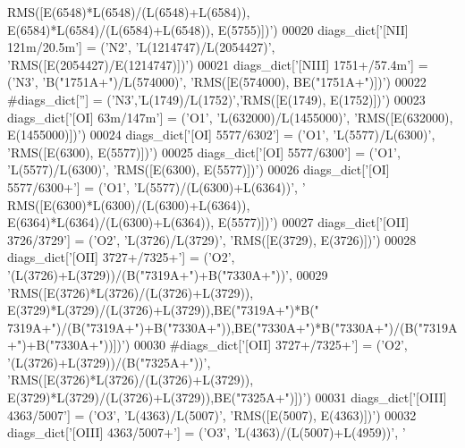 \begin{DoxyCode}
{      RMS([E(6548)*L(6548)/(L(6548)+L(6584)), E(6584)*L(6584)/(L(6584)+L(6548)), E(5755)])'})
00020 diags\_dict[\textcolor{stringliteral}{'[NII] 121m/20.5m'}] = (\textcolor{stringliteral}{'N2'}, \textcolor{stringliteral}{'L(1214747)/L(2054427)'}, \textcolor{stringliteral}{'RMS([E(2054427)/E(1214747)])'})
00021 diags\_dict[\textcolor{stringliteral}{'[NIII] 1751+/57.4m'}] = (\textcolor{stringliteral}{'N3'}, \textcolor{stringliteral}{'B("1751A+")/L(574000)'}, \textcolor{stringliteral}{'RMS([E(574000), BE("1751A+")])'})
00022 \textcolor{comment}{#diags\_dict[''] = ('N3','L(1749)/L(1752)','RMS([E(1749), E(1752)])')}
00023 diags\_dict[\textcolor{stringliteral}{'[OI] 63m/147m'}] = (\textcolor{stringliteral}{'O1'}, \textcolor{stringliteral}{'L(632000)/L(1455000)'}, \textcolor{stringliteral}{'RMS([E(632000), E(1455000)])'})
00024 diags\_dict[\textcolor{stringliteral}{'[OI] 5577/6302'}] = (\textcolor{stringliteral}{'O1'}, \textcolor{stringliteral}{'L(5577)/L(6300)'}, \textcolor{stringliteral}{'RMS([E(6300), E(5577)])'})
00025 diags\_dict[\textcolor{stringliteral}{'[OI] 5577/6300'}] = (\textcolor{stringliteral}{'O1'}, \textcolor{stringliteral}{'L(5577)/L(6300)'}, \textcolor{stringliteral}{'RMS([E(6300), E(5577)])'})
00026 diags\_dict[\textcolor{stringliteral}{'[OI] 5577/6300+'}] = (\textcolor{stringliteral}{'O1'}, \textcolor{stringliteral}{'L(5577)/(L(6300)+L(6364))'}, \textcolor{stringliteral}{'
      RMS([E(6300)*L(6300)/(L(6300)+L(6364)), E(6364)*L(6364)/(L(6300)+L(6364)), E(5577)])'})
00027 diags\_dict[\textcolor{stringliteral}{'[OII] 3726/3729'}] = (\textcolor{stringliteral}{'O2'}, \textcolor{stringliteral}{'L(3726)/L(3729)'}, \textcolor{stringliteral}{'RMS([E(3729), E(3726)])'})
00028 diags\_dict[\textcolor{stringliteral}{'[OII] 3727+/7325+'}] = (\textcolor{stringliteral}{'O2'}, \textcolor{stringliteral}{'(L(3726)+L(3729))/(B("7319A+")+B("7330A+"))'},
00029               \textcolor{stringliteral}{'RMS([E(3726)*L(3726)/(L(3726)+L(3729)), E(3729)*L(3729)/(L(3726)+L(3729)),BE("7319A+")*B("
      7319A+")/(B("7319A+")+B("7330A+")),BE("7330A+")*B("7330A+")/(B("7319A+")+B("7330A+"))])'})
00030 \textcolor{comment}{#diags\_dict['[OII] 3727+/7325+'] = ('O2', '(L(3726)+L(3729))/(B("7325A+"))',
       'RMS([E(3726)*L(3726)/(L(3726)+L(3729)), E(3729)*L(3729)/(L(3726)+L(3729)),BE("7325A+")])')}
00031 diags\_dict[\textcolor{stringliteral}{'[OIII] 4363/5007'}] = (\textcolor{stringliteral}{'O3'}, \textcolor{stringliteral}{'L(4363)/L(5007)'}, \textcolor{stringliteral}{'RMS([E(5007), E(4363)])'})
00032 diags\_dict[\textcolor{stringliteral}{'[OIII] 4363/5007+'}] = (\textcolor{stringliteral}{'O3'}, \textcolor{stringliteral}{'L(4363)/(L(5007)+L(4959))'}, \textcolor{stringliteral}{'
}
\end{DoxyCode}

